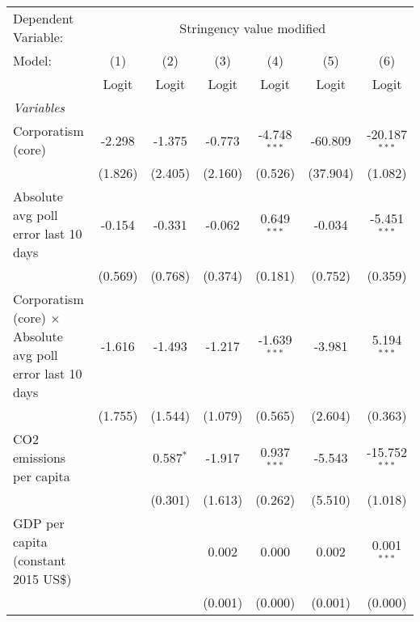 
\begingroup
\centering
\begin{tabular}{lcccccc}
   \toprule
   Dependent Variable: & \multicolumn{6}{c}{Stringency value modified}\\
   Model:                                                            & (1)     & (2)         & (3)     & (4)            & (5)             & (6)\\  
                                                                     &  Logit  & Logit       & Logit   & Logit          & Logit           & Logit\\  
   \midrule
   \emph{Variables}\\
   Corporatism (core)                                                & -2.298  & -1.375      & -0.773  & -4.748$^{***}$ & -60.809         & -20.187$^{***}$\\   
                                                                     & (1.826) & (2.405)     & (2.160) & (0.526)        & (37.904)        & (1.082)\\   
   Absolute avg poll error last 10 days                              & -0.154  & -0.331      & -0.062  & 0.649$^{***}$  & -0.034          & -5.451$^{***}$\\   
                                                                     & (0.569) & (0.768)     & (0.374) & (0.181)        & (0.752)         & (0.359)\\   
   Corporatism (core) $\times$ Absolute avg poll error last 10 days  & -1.616  & -1.493      & -1.217  & -1.639$^{***}$ & -3.981          & 5.194$^{***}$\\   
                                                                     & (1.755) & (1.544)     & (1.079) & (0.565)        & (2.604)         & (0.363)\\   
   CO2 emissions per capita                                          &         & 0.587$^{*}$ & -1.917  & 0.937$^{***}$  & -5.543          & -15.752$^{***}$\\   
                                                                     &         & (0.301)     & (1.613) & (0.262)        & (5.510)         & (1.018)\\   
   GDP per capita (constant 2015 US\$)                               &         &             & 0.002   & 0.000          & 0.002           & 0.001$^{***}$\\   
                                                                     &         &             & (0.001) & (0.000)        & (0.001)         & (0.000)\\   

\end{tabular}

